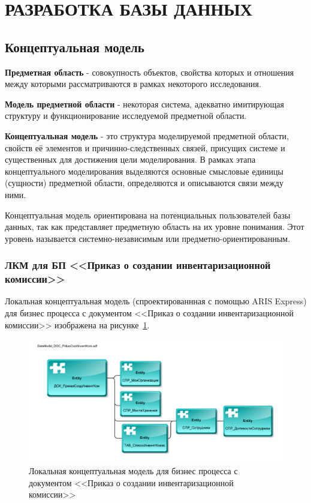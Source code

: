 \section{РАЗРАБОТКА БАЗЫ ДАННЫХ}
\subsection{Концептуальная модель}

\textbf{Предметная область} - совокупность объектов,
свойства которых и отношения между которыми рассматриваются в рамках некоторого исследования.

\textbf{Модель предметной области} - некоторая система, адекватно имитирующая
структуру и функционирование исследуемой предметной области.

\textbf{Концептуальная модель} - это структура моделируемой предметной области,
свойств её элементов и причинно-следственных связей, присущих системе и
существенных для достижения цели моделирования.
В рамках этапа концептуального моделирования выделяются основные смысловые единицы (сущности)
предметной области, определяются и описываются связи между ними.

Концептуальная модель ориентирована на потенциальных пользователей базы данных,
так как представляет предметную область на их уровне понимания.
Этот уровень называется системно-независимым или предметно-ориентированным.

\subsubsection{ЛКМ для БП <<Приказ о создании инвентаризационной комиссии>>}

Локальная концептуальная модель
(спроектированнная с помощью ARIS Express)
для бизнес процесса с документом <<Приказ о создании инвентаризационной комиссии>>
изображена на рисунке~\ref{fig:DataModel_DOC_PrikazCozdInventKom}.

\begin{figure}[!h]
    \centering

    \includegraphics[width=18cm]
    {assets/database/DataModel_DOC_PrikazCozdInventKom.adf.pdf}

    \caption{Локальная концептуальная модель для бизнес процесса с документом <<Приказ о создании инвентаризационной комиссии>>}

    \label{fig:DataModel_DOC_PrikazCozdInventKom}
\end{figure}

